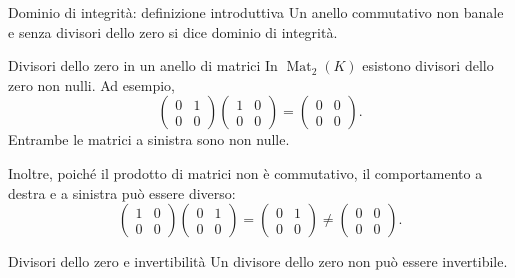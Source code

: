 \documentclass[a4paper]{article}
\begin{document}
\begin{radioactive}
\begin{snippetdefinition}{Dominio di integrità: definizione introduttiva}
    Un anello commutativo non banale e senza divisori dello zero si dice dominio di integrità.
\end{snippetdefinition}
\end{radioactive}

\begin{radioactive}
\begin{snippetexample}{Divisori dello zero in un anello di matrici}
    In \(\operatorname{Mat}_2(K)\) esistono divisori dello zero non nulli.
    Ad esempio,
    \[
        \begin{pmatrix}
            0 & 1 \\
            0 & 0
        \end{pmatrix}
        \begin{pmatrix}
            1 & 0 \\
            0 & 0
        \end{pmatrix}
        =
        \begin{pmatrix}
            0 & 0 \\
            0 & 0
        \end{pmatrix}.
    \]
    Entrambe le matrici a sinistra sono non nulle.

    Inoltre, poiché il prodotto di matrici non è commutativo, il comportamento a destra e a sinistra può essere diverso:
    \[
        \begin{pmatrix}
            1 & 0 \\
            0 & 0
        \end{pmatrix}
        \begin{pmatrix}
            0 & 1 \\
            0 & 0
        \end{pmatrix}
        =
        \begin{pmatrix}
            0 & 1 \\
            0 & 0
        \end{pmatrix}
        \neq
        \begin{pmatrix}
            0 & 0 \\
            0 & 0
        \end{pmatrix}.
    \]
\end{snippetexample}
\end{radioactive}

\begin{radioactive}
\begin{snippetproposition}{Divisori dello zero e invertibilità}
    Un divisore dello zero non può essere invertibile.
\end{snippetproposition}
\end{radioactive}
\end{document}
